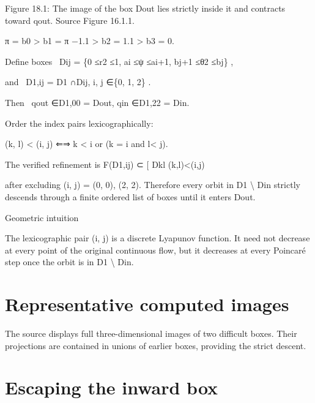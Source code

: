 \begin{figureplaceholder}
Figure 18.1: The image of the box Dout lies strictly inside it and contracts toward qout. Source Figure 16.1.1.
\end{figureplaceholder}

\begin{displaytext}
π = b0 > b1 = π −1.1 > b2 = 1.1 > b3 = 0.
\end{displaytext}

\begin{displaytext}
Define boxes \
Dij = \{0 ≤r2 ≤1, ai ≤ψ ≤ai+1, bj+1 ≤θ2 ≤bj\} ,
\end{displaytext}

\begin{displaytext}
and \
D1,ij = D1 ∩Dij, i, j ∈\{0, 1, 2\} .
\end{displaytext}

\begin{displaytext}
Then \
qout ∈D1,00 = Dout, qin ∈D1,22 = Din.
\end{displaytext}

Order the index pairs lexicographically:


\begin{displaytext}
(k, l) < (i, j) ⇐⇒ k < i or (k = i and l< j).
\end{displaytext}

The verified refinement is F(D1,ij) ⊂ [ Dkl (k,l)<(i,j)


after excluding (i, j) = (0, 0), (2, 2). Therefore every orbit in D1 \textbackslash{} Din strictly descends through a finite ordered list of boxes until it enters Dout.


\begin{insightbox}{Geometric intuition}
\end{insightbox}

The lexicographic pair (i, j) is a discrete Lyapunov function. It need not decrease at every point of the original continuous flow, but it decreases at every Poincaré step once the orbit is in D1 \textbackslash{} Din.


\section{Representative computed images}

The source displays full three-dimensional images of two difficult boxes. Their projections are contained in unions of earlier boxes, providing the strict descent.


\section{Escaping the inward box}

